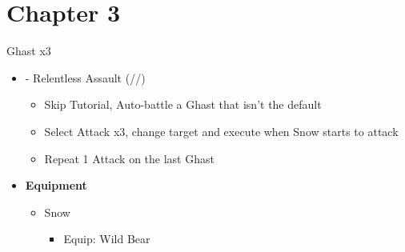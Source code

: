 \chapter{Chapter 3}

\renewcommand{\first}{[1] - Relentless Assault (\com/\rav/\rav)}

	\begin{battle}[0:12]{Ghast x3}
		\begin{itemize}
			\item \first
			      \begin{itemize}
				      \item Skip Tutorial, Auto-battle a Ghast that isn't the default
				      \item Select Attack x3, change target and execute when Snow starts to attack
				      \item Repeat 1 Attack on the last Ghast
			      \end{itemize}
		\end{itemize}
	\end{battle}
	\begin{menu}
		\begin{itemize}
			\item \textbf{Equipment}
			      \begin{itemize}
				      \item Snow
				            \begin{itemize}
					            \item Equip: Wild Bear
				            \end{itemize}
			      \end{itemize}
		\end{itemize}
	\end{menu}
